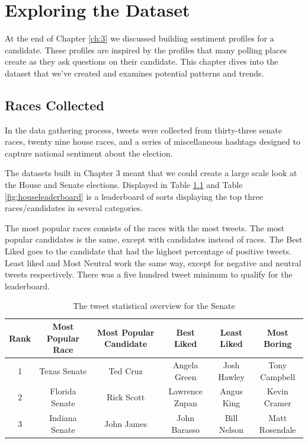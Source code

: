 \documentclass[11pt, twoside, reqno]{book}
\begin{document}
\chapter{Exploring the Dataset}
\label{ch:4}

\hspace{0.2in}At the end of Chapter \ref{ch:3} we discussed building sentiment profiles for a candidate. These profiles are inspired by the profiles that many polling places create as they ask questions on their candidate. This chapter dives into the dataset that we've created and examines potential patterns and trends. 

\section{Races Collected}
\hspace{0.2in}In the data gathering process, tweets were collected from thirty-three senate races, twenty nine house races, and a series of miscellaneous hashtags designed to capture national sentiment about the election. 

The datasets built in Chapter 3 meant that we could create a large scale look at the House and Senate elections. Displayed in Table \ref{fig:senleaderboard} and Table \ref{fig:houseleaderboard} is a leaderboard of sorts displaying the top three races/candidates in several categories. 

The most popular races consists of the races with the most tweets. The most popular candidates is the same, except with candidates instead of races. The Best Liked goes to the candidate that had the highest percentage of positive tweets. Least liked and Most Neutral work the same way, except for negative and neutral tweets respectively. There was a five hundred tweet minimum to qualify for the leaderboard. 
\begin{table}[H]
\centering
\begin{tabular}{ |c|c|c|c|c|c|} 
	\hline
	Rank & Most Popular Race & Most Popular Candidate& Best Liked & Least Liked & Most Boring \\
 	\hline 
	1 & Texas Senate & Ted Cruz & Angela Green & Josh Hawley & Tony Campbell\\
  	\hline
	2 & Florida Senate & Rick Scott & Lawrence Zupan & Angus King & Kevin Cramer\\ 
	\hline
	3 & Indiana Senate & John James & John Barasso & Bill Nelson& Matt Rosendale\\
	\hline
\end{tabular}
\caption{The tweet statistical overview for the Senate}\label{fig:senleaderboard}
\end{table}
\end{document}
